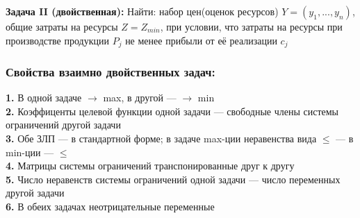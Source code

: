 \textbf{Задача II (двойственная):}
Найти: набор цен(оценок ресурсов) $Y=(y_1,...,y_n)$, общие затраты на ресурсы $Z=Z_{min}$, при условии, что затраты на ресурсы при производстве продукции $P_j$ не менее прибыли от её реализации $c_j$
\\
\subsubsection{Свойства взаимно двойственных задач:}
\textbf{1.} В одной задаче $\rightarrow$ max, в другой --- $\rightarrow$ min\\
\textbf{2.} Коэффиценты целевой функции одной задачи --- свободные члены системы ограничений другой задачи\\
\textbf{3.} Обе ЗЛП --- в стандартной форме; в задаче max-ции неравенства вида $\leq$ --- в min-ции --- $\leq$\\
\textbf{4.} Матрицы системы ограничений транспонированные друг к другу\\
\textbf{5.} Число неравенств системы ограничений одной задачи --- число переменных другой задачи\\
\textbf{6.} В обеих задачах неотрицательные переменные
